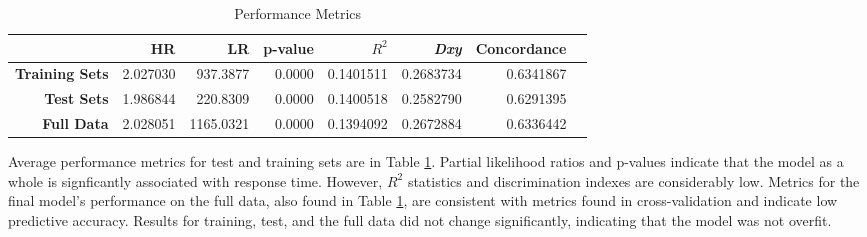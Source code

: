 \documentclass{article}
\begin{document}
\begin{table}[!htbp]
\centering
\begin{tabular}{| r | r | r | r | r  | r | r | r |}
  \hline
 & \textbf{HR} & \textbf{LR} & \textbf{p-value} & \textbf{$R^2$} & \textbf{\textit{Dxy}} & \textbf{Concordance} \\ 
  \hline
  \textbf{Training Sets} & 2.027030 & 937.3877 & 0.0000 & 0.1401511 & 0.2683734 & 0.6341867 \\ 
  \textbf{Test Sets} & 1.986844 & 220.8309 & 0.0000 & 0.1400518 & 0.2582790 & 0.6291395 \\
  \textbf{Full Data} & 2.028051 & 1165.0321 & 0.0000 & 0.1394092 & 0.2672884 & 0.6336442 \\ 
   \hline
\end{tabular}
\caption{Performance Metrics} 
\label{table:cv}
\end{table}

Average performance metrics for test and training sets are in Table \ref{table:cv}. Partial likelihood ratios and p-values indicate that the model as a whole is signficantly associated with response time. However, $R^2$ statistics and discrimination indexes are considerably low. Metrics for the final model's performance on the full data, also found in Table \ref{table:cv}, are consistent with metrics found in cross-validation and indicate low predictive accuracy. Results for training, test, and the full data did not change significantly, indicating that the model was not overfit. 
\end{document}
